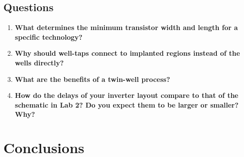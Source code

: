 \documentclass[12pt]{article}
\begin{document}
\subsection{Questions}
\begin{enumerate}
	\item \textbf{What determines the minimum transistor width and length for a specific technology?} \\

	\item \textbf{Why should well-taps connect to implanted regions instead of the wells directly?}\\
	
	\item \textbf{What are the benefits of a twin-well process?} \\
	
	\item \textbf{How do the delays of your inverter layout compare to that of the schematic in Lab 2? Do you expect them to be larger or smaller? Why?}\\
	
\end{enumerate}
\section{Conclusions}
\end{document}
